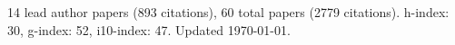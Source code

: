 14 lead author papers (893 citations),
60 total papers (2779 citations).\newline
h-index: 30, g-index: 52, i10-index: 47. Updated \today.
